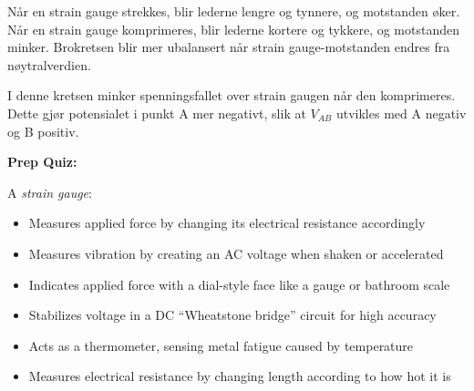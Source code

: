 
Når en strain gauge strekkes, blir lederne lengre og tynnere, og motstanden øker.  Når en strain gauge komprimeres, blir lederne kortere og tykkere, og motstanden minker.  Brokretsen blir mer ubalansert når strain gauge-motstanden endres fra nøytralverdien.

\vskip 10pt

I denne kretsen minker spenningsfallet over strain gaugen når den komprimeres.  Dette gjør potensialet i punkt A mer negativt, slik at $V_{AB}$ utvikles med A negativ og B positiv.













\vfil \eject

\noindent
{\bf Prep Quiz:}

A \textit{strain gauge}:

\begin{itemize}
\item{} Measures applied force by changing its electrical resistance accordingly
\vskip 5pt 
\item{} Measures vibration by creating an AC voltage when shaken or accelerated
\vskip 5pt 
\item{} Indicates applied force with a dial-style face like a gauge or bathroom scale
\vskip 5pt 
\item{} Stabilizes voltage in a DC ``Wheatstone bridge'' circuit for high accuracy
\vskip 5pt 
\item{} Acts as a thermometer, sensing metal fatigue caused by temperature
\vskip 5pt 
\item{} Measures electrical resistance by changing length according to how hot it is
\end{itemize}



